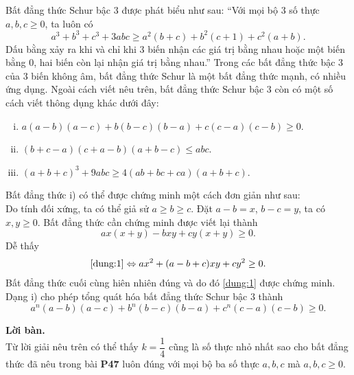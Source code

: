 \begin{bt}
{\begin{nx}
\begin{enumerate}[\bfseries 1.]
	Bất đẳng thức Schur bậc $3$ được phát biểu như sau: ``Với mọi bộ $3$ số thực $a,b,c \ge 0$, ta luôn có \[a^3+b^3+c^3+3abc \ge a^2(b+c)+b^2(c+1)+c^2(a+b).\]
	Dấu bằng xảy ra khi và chỉ khi $3$ biến nhận các giá trị bằng nhau hoặc một biến bằng $0$, hai biến còn lại nhận giá trị bằng nhau.'' 
	Trong các bất đẳng thức bậc $3$ của $3$ biến không âm, bất đẳng thức Schur là một bất đẳng thức mạnh, có nhiều ứng dụng. Ngoài cách viết nêu trên, bất đẳng thức Schur bậc $3$ còn có một số cách viết thông dụng khác dưới đây:
	\begin{enumerate}[i)]
		\item $a(a-b)(a-c) + b(b-c)(b-a) + c(c-a)(c-b) \ge 0$.
		\item $(b+c-a)(c+a-b)(a+b-c) \le abc$.
		\item $(a+b+c)^3 + 9abc \ge 4(ab+bc+ca)(a+b+c)$.
	\end{enumerate}
	Bất đẳng thức i) có thể được chứng minh một cách đơn giản như sau:\\
	Do tính đối xứng, ta có thể giả sử $a \ge b \ge c$. Đặt $a-b=x$, $b-c=y$, ta có $x,y \ge 0$. Bất đẳng thức cần chứng minh được viết lại thành
	\[ax(x+y)-bxy+cy(x+y) \ge 0. \tag{*} \label{dung:1}\]
	Dễ thấy
	\begin{align*}
	\eqref{dung:1} \Leftrightarrow ax^2+(a-b+c)xy+cy^2 \ge 0.
	\end{align*}
	Bất đẳng thức cuối cùng hiên nhiên đúng và do đó \eqref{dung:1} được chứng minh.
	Dạng i) cho phép tổng quát hóa bất đẳng thức Schur bậc $3$ thành
	$$a^n(a-b)(a-c) + b^n(b-c)(b-a) + c^n(c-a)(c-b) \ge 0.$$
\end{enumerate}
\end{nx}
\textbf{Lời bàn.} \\
Từ lời giải nêu trên có thể thấy $k = \dfrac{1}{4}$ cũng là số thực nhỏ nhất sao cho bất đẳng thức đã nêu trong bài \textbf{P47} luôn đúng với mọi bộ ba số thực $a,b,c$ mà $a,b,c \ge 0$.
}
\end{bt}

